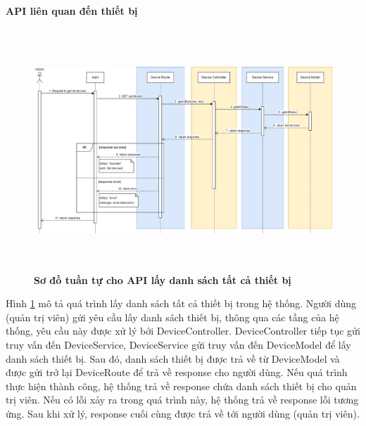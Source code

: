 
\paragraph{API liên quan đến thiết bị}
\mbox{}

\begin{figure}[H]
  \centering
  \includegraphics[width=16cm,height=9cm]{Images/sequence_api/getAllDevices.png}
  \caption[Sơ đồ tuần tự cho API lấy danh sách tất cả thiết bị ]{\bfseries \fontsize{12pt}{0pt}
  \selectfont Sơ đồ tuần tự cho API lấy danh sách tất cả thiết bị }
  \label{getAllDevices} %
\end{figure}
Hình \ref{getAllDevices} mô tả quá trình lấy danh sách tất cả thiết bị trong hệ thống. Người dùng (quản trị viên) gửi yêu cầu lấy danh sách thiết bị, thông qua các tầng của hệ thống, 
yêu cầu này được xử lý bởi DeviceController. DeviceController tiếp tục gửi truy vấn đến DeviceService, DeviceService gửi truy vấn đến DeviceModel để lấy danh sách thiết bị. Sau đó, danh sách thiết bị được trả về từ DeviceModel và được gửi trở lại DeviceRoute
 để trả về response cho người dùng. Nếu quá trình thực hiện thành công, hệ thống trả về response chứa danh sách thiết bị cho quản trị viên. Nếu có lỗi xảy ra trong quá trình này, hệ thống trả về response lỗi tương ứng. Sau khi xử lý, response cuối cùng được 
trả về tới người dùng (quản trị viên).

